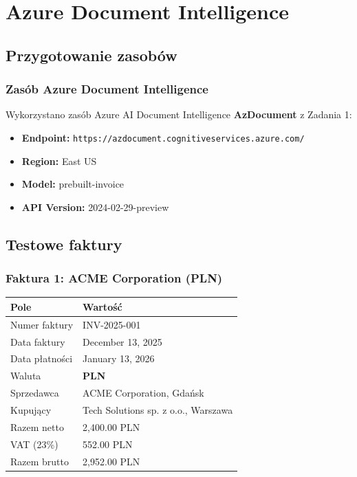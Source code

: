 \section{Azure Document Intelligence}

\subsection{Przygotowanie zasobów}

\subsubsection{Zasób Azure Document Intelligence}
Wykorzystano zasób Azure AI Document Intelligence \textbf{AzDocument} z Zadania 1:
\begin{itemize}
	\item \textbf{Endpoint:} \texttt{https://azdocument.cognitiveservices.azure.com/}
	\item \textbf{Region:} East US
	\item \textbf{Model:} prebuilt-invoice
	\item \textbf{API Version:} 2024-02-29-preview
\end{itemize}

\subsection{Testowe faktury}

\subsubsection{Faktura 1: ACME Corporation (PLN)}
\begin{center}
	\begin{tabular}{|l|l|}
		\hline
		\textbf{Pole} & \textbf{Wartość} \\
		\hline
		Numer faktury & INV-2025-001 \\
		Data faktury & December 13, 2025 \\
		Data płatności & January 13, 2026 \\
		Waluta & \textbf{PLN} \\
		Sprzedawca & ACME Corporation, Gdańsk \\
		Kupujący & Tech Solutions sp. z o.o., Warszawa \\
		Razem netto & 2,400.00 PLN \\
		VAT (23\%) & 552.00 PLN \\
		Razem brutto & 2,952.00 PLN \\
		\hline
	\end{tabular}
\end{center}

